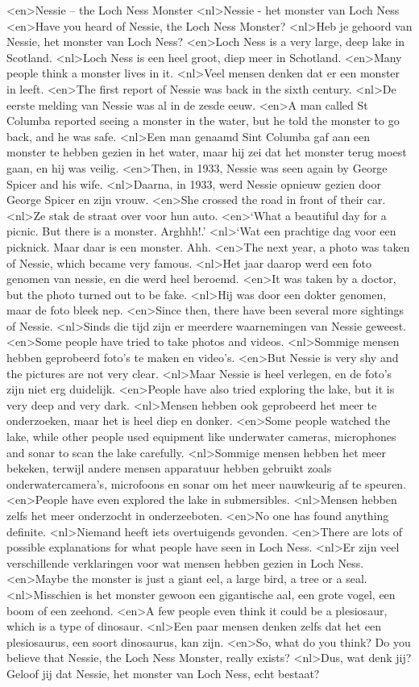 <en>Nessie – the Loch Ness Monster 
<nl>Nessie - het monster van Loch Ness
<en>Have you heard of Nessie, the Loch Ness Monster? 
<nl>Heb je gehoord van Nessie, het monster van Loch Ness? 
<en>Loch Ness is a very large, deep lake in Scotland.
<nl>Loch Ness is een heel groot, diep meer in Schotland.
<en>Many people think a monster lives in it.
<nl>Veel mensen denken dat er een monster in leeft.
<en>The first report of Nessie was back in the sixth century. 
<nl>De eerste melding van Nessie was al in de zesde eeuw.
<en>A man called St Columba reported seeing a monster in the water, but he told the monster to go back, and he was safe.
<nl>Een man genaamd Sint Columba gaf aan een monster te hebben gezien in het water, maar hij zei dat het monster terug moest gaan, en hij was veilig.
<en>Then, in 1933, Nessie was seen again by George Spicer and his wife.
<nl>Daarna, in 1933, werd Nessie opnieuw gezien door George Spicer en zijn vrouw.
<en>She crossed the road in front of their car.
<nl>Ze stak de straat over voor hun auto.
<en>‘What a beautiful day for a picnic. But there is a monster. Arghhh!.'
<nl>`Wat een prachtige dag voor een picknick. Maar daar is een monster. Ahh.
<en>The next year, a photo was taken of Nessie, which became very famous. 
<nl>Het jaar daarop werd een foto genomen van nessie, en die werd heel beroemd.
<en>It was taken by a doctor, but the photo turned out to be fake.
<nl>Hij was door een dokter genomen, maar de foto bleek nep.
<en>Since then, there have been several more sightings of Nessie. 
<nl>Sinds die tijd zijn er meerdere waarnemingen van Nessie geweest. 
<en>Some people have tried to take photos and videos.
<nl>Sommige mensen hebben geprobeerd foto's te maken en video's.
<en>But Nessie is very shy and the pictures are not very clear.
<nl>Maar Nessie is heel verlegen, en de foto's zijn niet erg duidelijk.
<en>People have also tried exploring the lake, but it is very deep and very dark. 
<nl>Mensen hebben ook geprobeerd het meer te onderzoeken, maar het is heel diep en donker.
<en>Some people watched the lake, while other people used equipment like underwater cameras, microphones and sonar to scan the lake carefully.
<nl>Sommige mensen hebben het meer bekeken, terwijl andere mensen apparatuur hebben gebruikt zoals onderwatercamera's, microfoons en sonar om het meer nauwkeurig af te speuren.
<en>People have even explored the lake in submersibles. 
<nl>Mensen hebben zelfs het meer onderzocht in onderzeeboten.
<en>No one has found anything definite. 
<nl>Niemand heeft iets overtuigends gevonden.
<en>There are lots of possible explanations for what people have seen in Loch Ness. 
<nl>Er zijn veel verschillende verklaringen voor wat mensen hebben gezien in Loch Ness. 
<en>Maybe the monster is just a giant eel, a large bird, a tree or a seal. 
<nl>Misschien is het monster gewoon een gigantische aal, een grote vogel, een boom of een zeehond. 
<en>A few people even think it could be a plesiosaur, which is a type of dinosaur.
<nl>Een paar mensen denken zelfs dat het een plesiosaurus, een soort dinosaurus, kan zijn.
<en>So, what do you think? Do you believe that Nessie, the Loch Ness Monster, really exists?
<nl>Dus, wat denk jij? Geloof jij dat Nessie, het monster van Loch Ness, echt bestaat?
